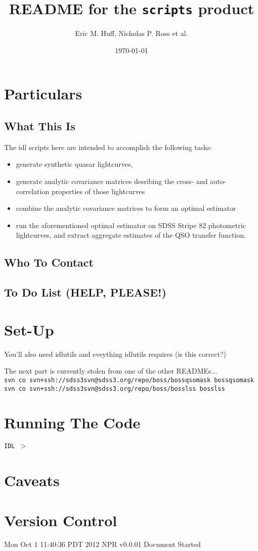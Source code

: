 \documentclass[11pt,a4paper]{article}
\begin{document}
\title{README for the {\tt scripts} product}
\author{Eric M. Huff, Nicholas P. Ross et al. }
\date{\today}
\maketitle


\begin{abstract}
\end{abstract}

\section{Particulars}
\subsection{What This Is}
The idl scripts here are intended to accomplish the following tasks:
\begin{itemize}
\item generate synthetic quasar lightcurves,
\item generate analytic covariance matrices desribing the cross- and
auto-correlation properties of those lightcurves
\item combine the analytic covariance matrices to form an optimal
  estimator
\item run the aforementioned optimal estimator on SDSS Stripe 82
  photometric lightcurves, and extract aggregate estimates of the
  QSO transfer function.
\end{itemize}

\subsection{Who To Contact}


\subsection{To Do List (HELP, PLEASE!)}


\section{Set-Up}
You'll also need idlutils and eveything idlutils requires (is this correct?)

\noindent
The next part is currently stolen from one of the other READMEs...\\

\noindent
    {\tt svn co svn+ssh://sdss3svn@sdss3.org/repo/boss/bossqsomask bossqsomask} \\
    {\tt svn co svn+ssh://sdss3svn@sdss3.org/repo/boss/bosslss bosslss} \\


\section{Running The Code}
{\tt IDL $>$} 

\section{Caveats}

\section{Version Control}
Mon Oct  1 11:40:36 PDT 2012      NPR    v0.0.01  Document Started
\end{document}
